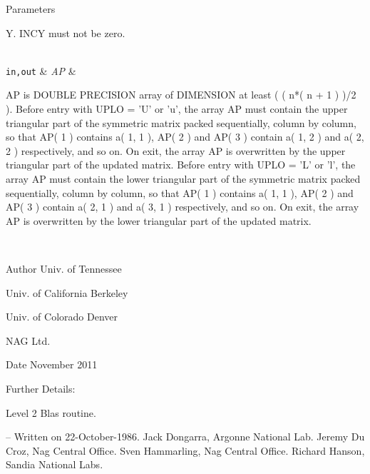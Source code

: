\begin{DoxyParams}[1]{Parameters}
\begin{DoxyVerb}
           Y. INCY must not be zero.\end{DoxyVerb}
\\
\hline
\mbox{\tt in,out}  & {\em A\+P} & \begin{DoxyVerb}          AP is DOUBLE PRECISION array of DIMENSION at least
           ( ( n*( n + 1 ) )/2 ).
           Before entry with  UPLO = 'U' or 'u', the array AP must
           contain the upper triangular part of the symmetric matrix
           packed sequentially, column by column, so that AP( 1 )
           contains a( 1, 1 ), AP( 2 ) and AP( 3 ) contain a( 1, 2 )
           and a( 2, 2 ) respectively, and so on. On exit, the array
           AP is overwritten by the upper triangular part of the
           updated matrix.
           Before entry with UPLO = 'L' or 'l', the array AP must
           contain the lower triangular part of the symmetric matrix
           packed sequentially, column by column, so that AP( 1 )
           contains a( 1, 1 ), AP( 2 ) and AP( 3 ) contain a( 2, 1 )
           and a( 3, 1 ) respectively, and so on. On exit, the array
           AP is overwritten by the lower triangular part of the
           updated matrix.\end{DoxyVerb}
 \\
\hline
\end{DoxyParams}
\begin{DoxyAuthor}{Author}
Univ. of Tennessee 

Univ. of California Berkeley 

Univ. of Colorado Denver 

N\+A\+G Ltd. 
\end{DoxyAuthor}
\begin{DoxyDate}{Date}
November 2011 
\end{DoxyDate}
\begin{DoxyParagraph}{Further Details\+: }
\begin{DoxyVerb}  Level 2 Blas routine.

  -- Written on 22-October-1986.
     Jack Dongarra, Argonne National Lab.
     Jeremy Du Croz, Nag Central Office.
     Sven Hammarling, Nag Central Office.
     Richard Hanson, Sandia National Labs.\end{DoxyVerb}
 
\end{DoxyParagraph}
\hypertarget{group__double__blas__level2_ga6ab49c8fa5e2608d9545483045bf3d03}{}

